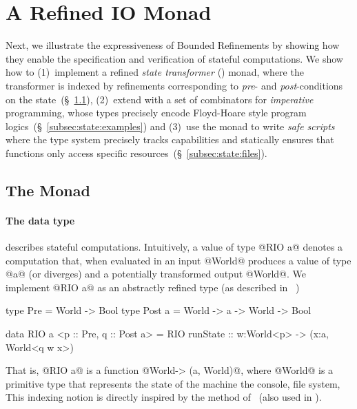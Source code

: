 \section{A Refined IO Monad}\label{sec:state}

Next, we illustrate the expressiveness of Bounded Refinements by 
showing how they enable the specification and verification of 
stateful computations. We show how to 
%
(1)~implement a refined \emph{state transformer} 
    (\RIO) monad, where the transformer is indexed by refinements 
    corresponding to \emph{pre}- and \emph{post}-conditions 
    on the state~(\S~\ref{subsec:state:definition}),
%
(2)~extend \RIO with a set of combinators for 
    \emph{imperative} programming, \ie whose types 
    precisely encode Floyd-Hoare style program 
    logics~(\S~\ref{subsec:state:examples}) and
%
(3)~use the \RIO monad to write \emph{safe scripts}
    where the type system precisely tracks capabilities
    and statically ensures that functions only access 
    specific resources~(\S~\ref{subsec:state:files}).


\subsection{The \RIO Monad}
\label{subsec:state:definition}

\paragraph{The \RIO data type} describes stateful computations.
Intuitively, a value of type @RIO a@ denotes a computation 
that, when evaluated in an input @World@ produces a value 
of type @a@ (or diverges) and a potentially transformed 
output @World@. We implement @RIO a@ as an abstractly
refined type (as described in ~\citep{vazou13})
%
%
\begin{code}
  type Pre    = World -> Bool 
  type Post a = World -> a -> World -> Bool 

  data RIO a <p :: Pre, q :: Post a> = RIO { 
    runState :: w:World<p> -> (x:a, World<q w x>) 
  }
\end{code}
%
That is, @RIO a@ is a function @World-> (a, World)@, where
@World@ is a primitive type that represents the state of 
the machine \ie the console, file system, \etc
%
This indexing notion is directly inspired by the method 
of~\citep{Filliatre98} (also used in \cite{ynot}).


